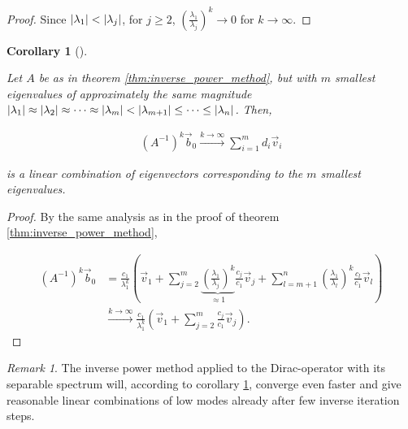 \documentclass{article}
\theoremstyle{plain} %
\newtheorem{theorem}{Theorem}[section]
\newtheorem{corollary}[theorem]{Corollary}
\theoremstyle{convention} %
\theoremstyle{remark} %
\newtheorem*{remark}{Remark} %
\numberwithin{equation}{section}
\begin{document}
\begin{appendix}
\begin{proof}
Since $\abs{\lambda_1} < \abs{\lambda_j}$, for $j \ge 2$, $\left(\frac{\lambda_1}{\lambda_j}\right)^k \to 0$ for $k \to \infty$.

\end{proof}

\begin{corollary}[]

\label{cor:inverse_power_method}

Let $A$ be as in theorem \ref{thm:inverse_power_method}, but with $m$ smallest eigenvalues of approximately the same magnitude $\abs{\lambda_1} \approx \abs{\lambda_2} \approx \dots \approx \abs{\lambda_{m}} < \abs{\lambda_{m+1}} \leq \dots \leq \abs{\lambda_n}$. Then,

\begin{align*}
  (A^{-1})^k \vec{b}_0 \xrightarrow{k\rightarrow\infty} \sum_{i=1}^m d_i \vec{v}_i
\end{align*}

is a linear combination of eigenvectors corresponding to the $m$ smallest eigenvalues.

\end{corollary}

\begin{proof}

By the same analysis as in the proof of theorem \ref{thm:inverse_power_method},

\begin{align*}
  (A^{-1})^k \vec{b}_0 &= \frac{c_1}{\lambda_1^k} \left( \vec{v}_1 + \sum_{j=2}^m \underbrace{\left(\frac{\lambda_1}{\lambda_j}\right)^k}_{\approx 1} \frac{c_j}{c_1} \vec{v}_j + \sum_{l=m+1}^n \left(\frac{\lambda_1}{\lambda_l}\right)^k \frac{c_l}{c_1} \vec{v}_l \right) \\
  &\xrightarrow{k\rightarrow\infty} \frac{c_1}{\lambda_1^k} \left( \vec{v}_1 + \sum_{j=2}^m \frac{c_j}{c_1} \vec{v}_j \right).
\end{align*}

\end{proof}

\begin{remark}
  The inverse power method applied to the Dirac-operator with its separable spectrum will, according to corollary \ref{cor:inverse_power_method}, converge even faster and give reasonable linear combinations of low modes already after few inverse iteration steps.
\end{remark}

\end{appendix}
\end{document}
